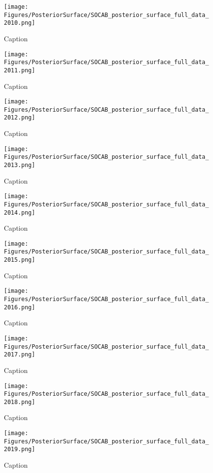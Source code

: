 \begin{figure}
    \centering
    \texttt{[image: Figures/PosteriorSurface/SOCAB\_posterior\_surface\_full\_data\_2010.png]}
    \caption{Caption}
    \label{fig:my_label}
\end{figure}

\begin{figure}
    \centering
    \texttt{[image: Figures/PosteriorSurface/SOCAB\_posterior\_surface\_full\_data\_2011.png]}
    \caption{Caption}
    \label{fig:my_label}
\end{figure}

\begin{figure}
    \centering
    \texttt{[image: Figures/PosteriorSurface/SOCAB\_posterior\_surface\_full\_data\_2012.png]}
    \caption{Caption}
    \label{fig:my_label}
\end{figure}

\begin{figure}
    \centering
    \texttt{[image: Figures/PosteriorSurface/SOCAB\_posterior\_surface\_full\_data\_2013.png]}
    \caption{Caption}
    \label{fig:my_label}
\end{figure}

\begin{figure}
    \centering
    \texttt{[image: Figures/PosteriorSurface/SOCAB\_posterior\_surface\_full\_data\_2014.png]}
    \caption{Caption}
    \label{fig:my_label}
\end{figure}

\begin{figure}
    \centering
    \texttt{[image: Figures/PosteriorSurface/SOCAB\_posterior\_surface\_full\_data\_2015.png]}
    \caption{Caption}
    \label{fig:my_label}
\end{figure}

\begin{figure}
    \centering
    \texttt{[image: Figures/PosteriorSurface/SOCAB\_posterior\_surface\_full\_data\_2016.png]}
    \caption{Caption}
    \label{fig:my_label}
\end{figure}

\begin{figure}
    \centering
    \texttt{[image: Figures/PosteriorSurface/SOCAB\_posterior\_surface\_full\_data\_2017.png]}
    \caption{Caption}
    \label{fig:my_label}
\end{figure}

\begin{figure}
    \centering
    \texttt{[image: Figures/PosteriorSurface/SOCAB\_posterior\_surface\_full\_data\_2018.png]}
    \caption{Caption}
    \label{fig:my_label}
\end{figure}

\begin{figure}
    \centering
    \texttt{[image: Figures/PosteriorSurface/SOCAB\_posterior\_surface\_full\_data\_2019.png]}
    \caption{Caption}
    \label{fig:my_label}
\end{figure}